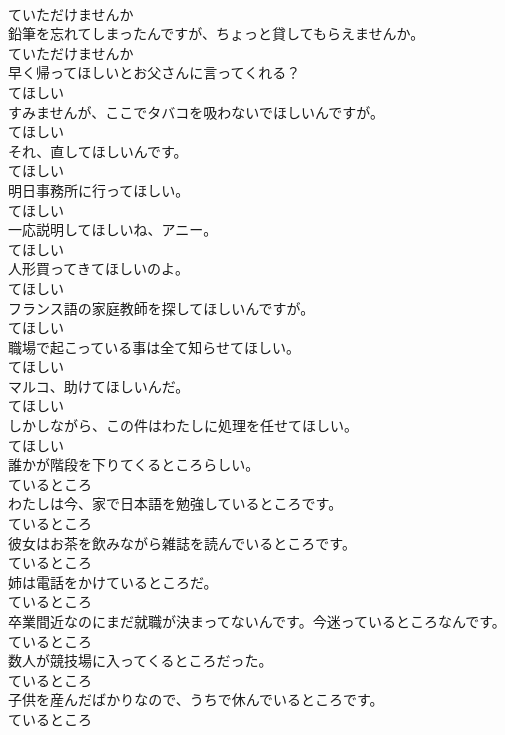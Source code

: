 \documentclass[8pt]{extreport}
\begin{document}
\begin{CJK}{UTF8}{min}
\\	ていただけませんか
\\	鉛筆を忘れてしまったんですが、ちょっと貸してもらえませんか。	
\\	ていただけませんか
\\	早く帰ってほしいとお父さんに言ってくれる？	
\\	てほしい
\\	すみませんが、ここでタバコを吸わないでほしいんですが。	
\\	てほしい
\\	それ、直してほしいんです。	
\\	てほしい
\\	明日事務所に行ってほしい。	
\\	てほしい
\\	一応説明してほしいね、アニー。	
\\	てほしい
\\	人形買ってきてほしいのよ。	
\\	てほしい
\\	フランス語の家庭教師を探してほしいんですが。	
\\	てほしい
\\	職場で起こっている事は全て知らせてほしい。	
\\	てほしい
\\	マルコ、助けてほしいんだ。	
\\	てほしい
\\	しかしながら、この件はわたしに処理を任せてほしい。	
\\	てほしい
\\	誰かが階段を下りてくるところらしい。	
\\	ているところ
\\	わたしは今、家で日本語を勉強しているところです。	
\\	ているところ
\\	彼女はお茶を飲みながら雑誌を読んでいるところです。	
\\	ているところ
\\	姉は電話をかけているところだ。	
\\	ているところ
\\	卒業間近なのにまだ就職が決まってないんです。今迷っているところなんです。	
\\	ているところ
\\	数人が競技場に入ってくるところだった。	
\\	ているところ
\\	子供を産んだばかりなので、うちで休んでいるところです。	
\\	ているところ

\end{CJK}
\end{document}

